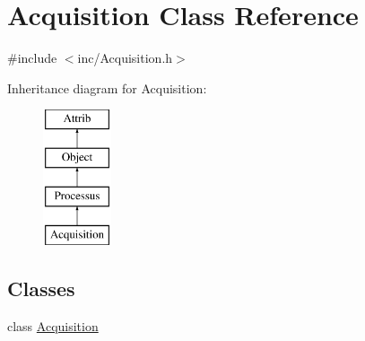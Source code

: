 \hypertarget{classAcquisition}{}\section{Acquisition Class Reference}
\label{classAcquisition}


{\ttfamily \#include $<$inc/\+Acquisition.\+h$>$}

Inheritance diagram for Acquisition\+:\begin{figure}[H]
\begin{center}
\leavevmode
\includegraphics[height=4.000000cm]{classAcquisition}
\end{center}
\end{figure}
\subsection*{Classes}
\begin{DoxyCompactItemize}
\item 
class \hyperlink{classAcquisition_1_1Acquisition}{Acquisition}
\end{DoxyCompactItemize}
